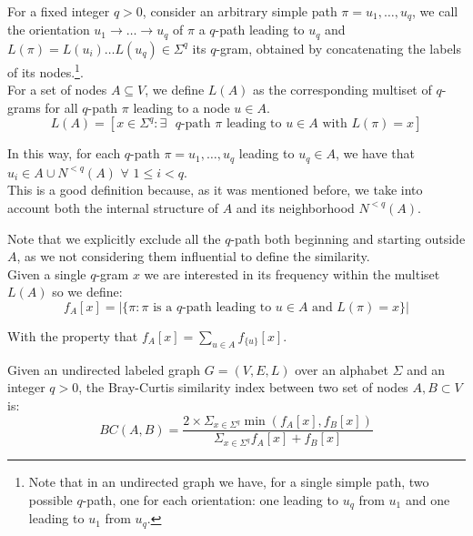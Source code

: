 For a fixed integer $q > 0$, consider an arbitrary simple path $\pi = u_{1}, \ldots, u_{q}$, we call the orientation $u_{1} \rightarrow \ldots \rightarrow u_{q}$ of $\pi$ a $q$-path leading to $u_{q}$ and $L(\pi) = L(u_{i}) \ldots L(u_{q}) \in \Sigma^{q}$ its $q$-gram, obtained by concatenating the labels of its nodes.\footnote{Note that in an undirected graph we have, for a single simple path, two possible $q$-path, one for each orientation: one leading to $u_{q}$ from $u_{1}$ and one leading to $u_{1}$ from $u_{q}$.}.\\

For a set of nodes $A \subseteq V$, we define $L(A)$ as the corresponding multiset of $q$-grams for all $q$-path $\pi$ leading to a node $u \in A$. 
\begin{equation}
L(A) = [x \in \Sigma^{q} : \exists \text{ $q$-path } \pi \text{ leading to } u \in A \text{ with } L(\pi) = x]
\end{equation}

In this way, for each $q$-path $\pi = u_{1}, \ldots, u_{q}$ leading to $u_{q} \in A$, we have that $u_{i} \in A \cup N^{<q}(A)$ $\forall$ $1 \leq i < q$. \\

This is a good definition because, as it was mentioned before, we take into account both the internal structure of $A$ and its neighborhood $N^{<q}(A)$. 

Note that we explicitly exclude all the $q$-path both beginning and starting outside $A$, as we not considering them influential to define the similarity.\\

Given a single $q$-gram $x$ we are interested in its frequency within the multiset $L(A)$ so we define:
\begin{equation}
	f_{A}[x] = |\{ \pi : \pi \text{ is a $q$-path leading to } u \in A \text{ and } L(\pi) = x \}|
\end{equation}

With the property that $f_{A}[x] = \sum_{u \in A}{f_{\{u\}}[x]}$.

\begin{definizione}
	Given an undirected labeled graph $G = (V,E,L)$ over an alphabet $\Sigma$ and an integer $q > 0$, the Bray-Curtis similarity index between two set of nodes $A, B \subset V$ is:
	\begin{equation}	
		BC(A,B) = \frac{ 2 \times \Sigma_{x \in \Sigma^{q}} \min(f_{A}[x], f_{B}[x]) }{ \Sigma_{x \in \Sigma^{q}} f_{A}[x] + f_{B}[x] }
	\end{equation}
\end{definizione}

